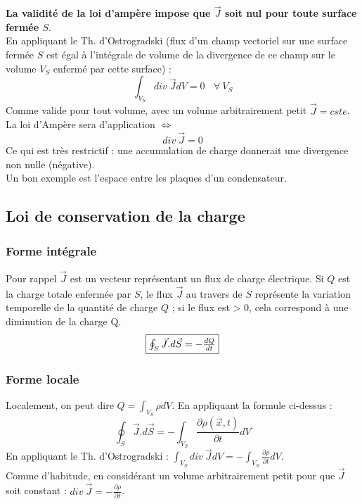 \documentclass	[11pt, a4paper, openany]{book}
\begin{document}
	\textbf{La validité de la loi d'ampère impose que $\vec{J}$ soit nul pour toute surface fermée $S$}.\\
	En appliquant le Th. d'Ostrogradski (flux d'un champ vectoriel sur une surface fermée $S$ est égal à l'intégrale de volume de la divergence de ce champ sur le volume $V_S$ enfermé par cette surface) :
	\begin{equation}
		\int_{V_S} div\ \vec{J} dV = 0\ \ \ \ \forall\ V_S
	\end{equation}
	Comme valide pour tout volume, avec un volume arbitrairement petit $\vec{J} = cste$. La loi d'Ampère sera d'application $\Leftrightarrow$
	\begin{equation}
		div\ \vec{J} = 0
	\end{equation}
	Ce qui est très restrictif : une accumulation de charge donnerait une divergence non nulle (négative).\\
	Un bon exemple est l'espace entre les plaques d'un condensateur.
	
	\subsection{Loi de conservation de la charge}
	\subsubsection{Forme intégrale}
	Pour rappel $\vec{J}$ est un vecteur représentant un flux de charge électrique. Si $Q$ est la charge totale enfermée par $S$, le flux $\vec{J}$ au travers de $S$ représente la variation temporelle de la quantité de charge $Q$ ; si le flux est > 0, cela correspond à une diminution de la charge Q.
	\begin{equation}
		\fbox{$ \oint_S \vec{J}.d\vec{S} = - \frac{dQ}{dt}$}
	\end{equation}
	
	\subsubsection{Forme locale}
	Localement, on peut dire $Q = \int_{V_S} \rho dV$. En appliquant la formule ci-dessus :
	\begin{equation}
		\oint_S \vec{J}.d\vec{S} = - \int_{V_S} \frac{\partial\rho(\vec{x}, t)}{\partial t}dV
	\end{equation}
	En appliquant le Th. d'Ostrogradski : 
	$\int_{V_S} div\ \vec{J}dV = -\int_{V_S} \frac{\partial\rho}{\partial t}dV$.\\
	Comme d'habitude, en considérant un volume arbitrairement petit pour que $\vec{J}$ soit constant : $div\ \vec{J} = -\frac{\partial \rho}{\partial t}$.\\
	
\end{document}
